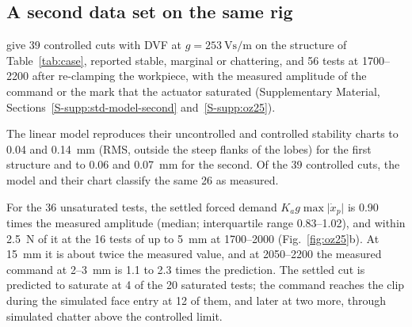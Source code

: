 
\subsection{A second data set on the same rig}\label{sec:model-second}

\citet{ozsoy2025frequency} give 39 controlled cuts with DVF at $g=\SI{253}{\volt\second\per\metre}$ on the structure of Table~\ref{tab:case}, reported stable, marginal or chattering, and 56 tests at 1700--\SI{2200}{\rpm} after re-clamping the workpiece, with the measured amplitude of the command or the mark that the actuator saturated (Supplementary Material, Sections~\ref{S-supp:std-model-second} and~\ref{S-supp:oz25}).

The linear model reproduces their uncontrolled and controlled stability charts to 0.04 and \SI{0.14}{\milli\metre} (RMS, outside the steep flanks of the lobes) for the first structure and to 0.06 and \SI{0.07}{\milli\metre} for the second. Of the 39 controlled cuts, the model and their chart classify the same 26 as measured.

For the 36 unsaturated tests, the settled forced demand $K_ag\max\lvert\dot x_p\rvert$ is 0.90 times the measured amplitude (median; interquartile range 0.83--1.02), and within \SI{2.5}{\newton} of it at the 16 tests of up to \SI{5}{\milli\metre} at 1700--\SI{2000}{\rpm} (Fig.~\ref{fig:oz25}b). At \SI{15}{\milli\metre} it is about twice the measured value, and at 2050--\SI{2200}{\rpm} the measured command at 2--\SI{3}{\milli\metre} is 1.1 to 2.3 times the prediction. The settled cut is predicted to saturate at 4 of the 20 saturated tests; the command reaches the clip during the simulated face entry at 12 of them, and later at two more, through simulated chatter above the controlled limit.

